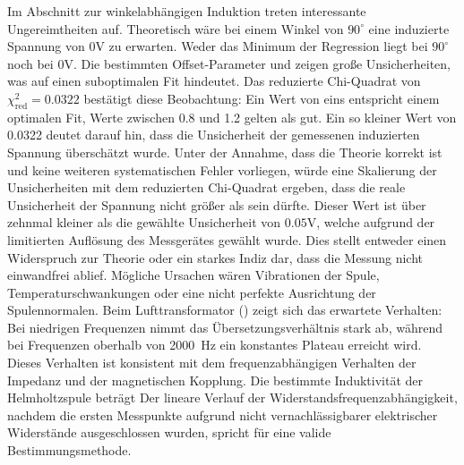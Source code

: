 Im Abschnitt  zur winkelabhängigen Induktion treten interessante Ungereimtheiten auf. Theoretisch wäre bei einem Winkel von $90^\circ$ eine induzierte Spannung von 0V zu erwarten. Weder das Minimum der Regression liegt bei $90^\circ$ noch bei 0V. Die bestimmten Offset-Parameter 
und 
zeigen große Unsicherheiten, was auf einen suboptimalen Fit hindeutet. Das reduzierte Chi-Quadrat von $\chi^2_\text{red} = 0.0322$ bestätigt diese Beobachtung: Ein Wert von eins entspricht einem optimalen Fit, Werte zwischen 0.8 und 1.2 gelten als gut. Ein so kleiner Wert von 0.0322 deutet darauf hin, dass die Unsicherheit der gemessenen induzierten Spannung überschätzt wurde. Unter der Annahme, dass die Theorie korrekt ist und keine weiteren systematischen Fehler vorliegen, würde eine Skalierung der Unsicherheiten mit dem reduzierten Chi-Quadrat ergeben, dass die reale Unsicherheit der Spannung nicht größer als 
sein dürfte. Dieser Wert ist über zehnmal kleiner als die gewählte Unsicherheit von $0.05$V, welche aufgrund der limitierten Auflösung des Messgerätes gewählt wurde. Dies stellt entweder einen Widerspruch zur Theorie oder ein starkes Indiz dar, dass die Messung nicht einwandfrei ablief. Mögliche Ursachen wären Vibrationen der Spule, Temperaturschwankungen oder eine nicht perfekte Ausrichtung der Spulennormalen.
Beim Lufttransformator () zeigt sich das erwartete Verhalten: Bei niedrigen Frequenzen nimmt das Übersetzungsverhältnis stark ab, während bei Frequenzen oberhalb von \SI{2000}{\Hz} ein konstantes Plateau erreicht wird. Dieses Verhalten ist konsistent mit dem frequenzabhängigen Verhalten der Impedanz und der magnetischen Kopplung.
Die bestimmte Induktivität der Helmholtzspule beträgt 
Der lineare Verlauf der Widerstandsfrequenzabhängigkeit, nachdem die ersten Messpunkte aufgrund nicht vernachlässigbarer elektrischer Widerstände ausgeschlossen wurden, spricht für eine valide Bestimmungsmethode.

